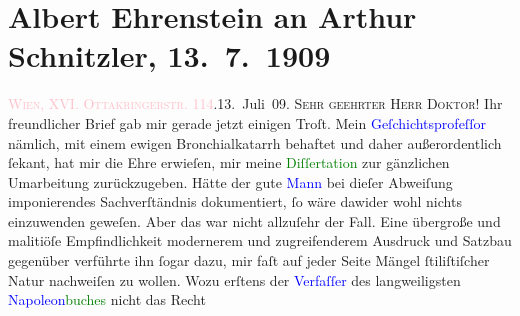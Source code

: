 

               \section[Albert Ehrenstein an Arthur Schnitzler, 13. 7. 1909]{ Albert Ehrenstein an Arthur Schnitzler, 13. 7. 1909}\nopagebreak{}\rehead{ }\normalsize\beginnumbering{} \toendnotes[C]{\smallbreak\pagebreak[2]} 
\toendnotes[C]{\smallbreak}\pstart
           {\pb}\textcolor{pink}{\textsc{Wien, XVI. Ottakringerstr.} 114}{}\ledrightnote{\textcolor{pink}{Ottakringerstraße}}.\hfill 13. Juli 09.\pend
           \pstart{}\textsc{Sehr geehrter Herr Doktor!}\pend\pstart
           Ihr freundlicher Brief gab mir gerade jetzt einigen Troſt. Mein \textcolor{blue}{Geſchichtsprofeſſor}{} nämlich, mit einem
                    ewigen Bronchialkatarrh behaftet und daher außerordentlich ſekant, hat mir die
                    Ehre erwieſen, mir meine \textcolor{green}{Diſſertation}{} zur gänzlichen Umarbeitung zurückzugeben. Hätte der gute
                        \textcolor{blue}{Mann}{} bei dieſer
                    Abweiſung imponierendes Sachverſtändnis dokumentiert, ſo wäre dawider wohl
                    nichts einzuwenden geweſen. Aber das war nicht allzuſehr der Fall. Eine
                    übergroße und malitiöſe Empfindlichkeit modernerem und zugreifenderem Ausdruck
                    und Satzbau gegenüber verführte ihn ſogar dazu, mir faſt auf jeder Seite Mängel
                    ſtiliſtiſcher Natur nachweiſen zu wollen. Wozu erſtens der \textcolor{blue}{Verfaſſer}{} des langweiligsten \textcolor{green}{\textcolor{blue}{Napoleon}{}\ledrightnote{\textcolor{blue}{Napoleon Bonaparte}}buches}{} nicht das Recht
